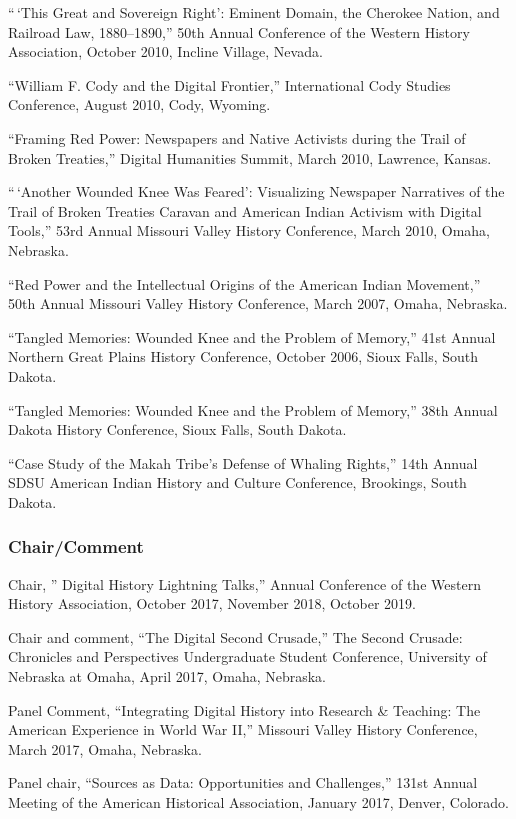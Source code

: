 ``\,`This Great and Sovereign Right': Eminent Domain, the Cherokee
Nation, and Railroad Law, 1880--1890,'' 50th Annual Conference of the
Western History Association, October 2010, Incline Village, Nevada.

``William F. Cody and the Digital Frontier,'' International Cody Studies
Conference, August 2010, Cody, Wyoming.

``Framing Red Power: Newspapers and Native Activists during the Trail of
Broken Treaties,'' Digital Humanities Summit, March 2010, Lawrence,
Kansas.

``\,`Another Wounded Knee Was Feared': Visualizing Newspaper Narratives
of the Trail of Broken Treaties Caravan and American Indian Activism
with Digital Tools,'' 53rd Annual Missouri Valley History Conference,
March 2010, Omaha, Nebraska.

``Red Power and the Intellectual Origins of the American Indian
Movement,'' 50th Annual Missouri Valley History Conference, March 2007,
Omaha, Nebraska.

``Tangled Memories: Wounded Knee and the Problem of Memory,'' 41st
Annual Northern Great Plains History Conference, October 2006, Sioux
Falls, South Dakota.

``Tangled Memories: Wounded Knee and the Problem of Memory,'' 38th
Annual Dakota History Conference, Sioux Falls, South Dakota.

``Case Study of the Makah Tribe's Defense of Whaling Rights,'' 14th
Annual SDSU American Indian History and Culture Conference, Brookings,
South Dakota.

\hypertarget{chaircomment}{%
\subsubsection{Chair/Comment}\label{chaircomment}}

Chair, '' Digital History Lightning Talks,'' Annual Conference of the
Western History Association, October 2017, November 2018, October 2019.

Chair and comment, ``The Digital Second Crusade,'' The Second Crusade:
Chronicles and Perspectives Undergraduate Student Conference, University
of Nebraska at Omaha, April 2017, Omaha, Nebraska.

Panel Comment, ``Integrating Digital History into Research \& Teaching:
The American Experience in World War II,'' Missouri Valley History
Conference, March 2017, Omaha, Nebraska.

Panel chair, ``Sources as Data: Opportunities and Challenges,'' 131st
Annual Meeting of the American Historical Association, January 2017,
Denver, Colorado.

